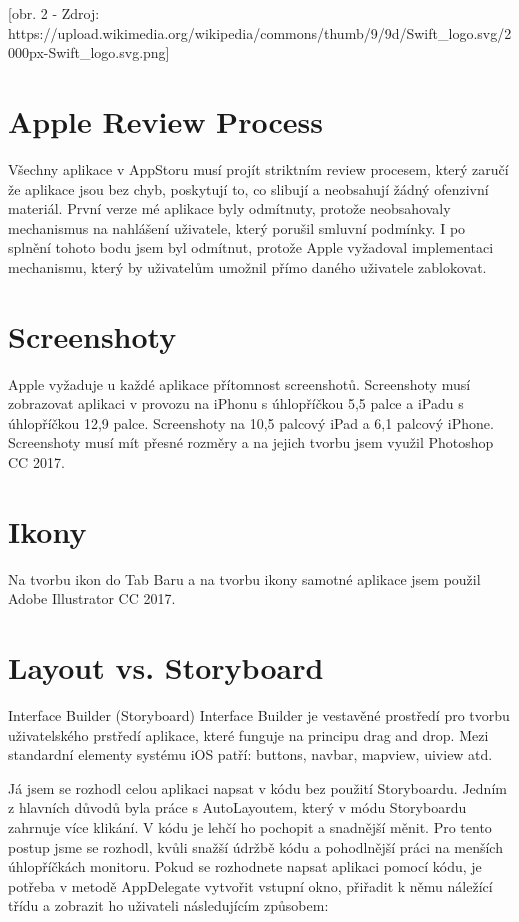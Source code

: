 \documentclass{article}
\begin{document}
[obr. 2 - Zdroj: https://upload.wikimedia.org/wikipedia/commons/thumb/9/9d/Swift_logo.svg/2000px-Swift_logo.svg.png]

\vspace{10 mm}
\section{Apple Review Process}
Všechny aplikace v AppStoru musí projít striktním review procesem, který zaručí že aplikace jsou bez chyb, poskytují to, co slibují a neobsahují žádný ofenzivní materiál. První verze mé aplikace byly odmítnuty, protože neobsahovaly mechanismus na nahlášení uživatele, který porušil smluvní podmínky. I po splnění tohoto bodu jsem byl odmítnut, protože Apple vyžadoval implementaci mechanismu, který by uživatelům umožnil přímo daného uživatele zablokovat. 

\vspace{10 mm}
\section{Screenshoty}
Apple vyžaduje u každé aplikace přítomnost screenshotů. Screenshoty musí zobrazovat aplikaci v provozu na iPhonu s úhlopříčkou 5,5 palce a iPadu s úhlopříčkou 12,9 palce. Screenshoty na 10,5 palcový iPad a 6,1 palcový iPhone. Screenshoty musí mít přesné rozměry a na jejich tvorbu jsem využil Photoshop CC 2017.

\vspace{10 mm}

\section{Ikony}

Na tvorbu ikon do Tab Baru a na tvorbu ikony samotné aplikace jsem použil Adobe Illustrator CC 2017. 
\vspace{10 mm}
        
\section{Layout vs. Storyboard}

Interface Builder (Storyboard)
Interface Builder je vestavěné prostředí pro tvorbu uživatelského prstředí aplikace, které funguje na principu drag and drop. Mezi standardní elementy systému iOS patří: buttons, navbar, mapview, uiview atd.
\vspace{10 mm}

Já jsem se rozhodl celou aplikaci napsat v kódu bez použití Storyboardu. 
Jedním z hlavních důvodů byla práce s AutoLayoutem, který v módu Storyboardu zahrnuje více klikání. V kódu je lehčí ho pochopit a snadnější měnit. 
Pro tento postup jsme se rozhodl, kvůli snažší údržbě kódu a pohodlnější práci na menších úhlopříčkách monitoru. Pokud se rozhodnete napsat aplikaci pomocí kódu, je potřeba v metodě AppDelegate vytvořit vstupní okno, přiřadit k němu náležící třídu a zobrazit ho uživateli následujícím způsobem:
\vspace{10 mm}
\end{document}
